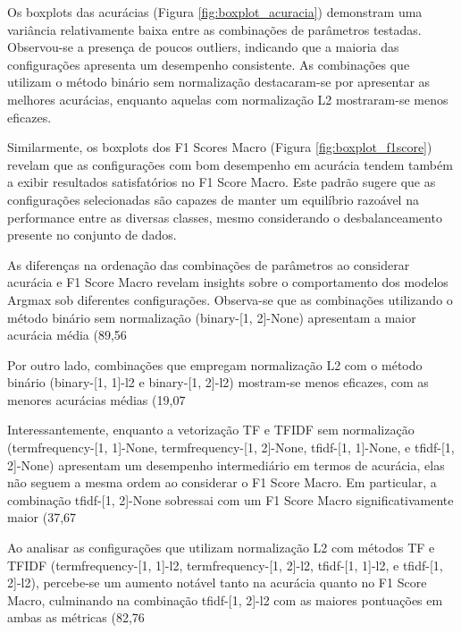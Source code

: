 Os boxplots das acurácias (Figura \ref{fig:boxplot_acuracia}) demonstram uma variância relativamente baixa entre as combinações de parâmetros testadas. Observou-se a presença de poucos outliers, indicando que a maioria das configurações apresenta um desempenho consistente. As combinações que utilizam o método binário sem normalização destacaram-se por apresentar as melhores acurácias, enquanto aquelas com normalização L2 mostraram-se menos eficazes.

Similarmente, os boxplots dos F1 Scores Macro (Figura \ref{fig:boxplot_f1score}) revelam que as configurações com bom desempenho em acurácia tendem também a exibir resultados satisfatórios no F1 Score Macro. Este padrão sugere que as configurações selecionadas são capazes de manter um equilíbrio razoável na performance entre as diversas classes, mesmo considerando o desbalanceamento presente no conjunto de dados.

As diferenças na ordenação das combinações de parâmetros ao considerar acurácia e F1 Score Macro revelam insights sobre o comportamento dos modelos Argmax sob diferentes configurações. Observa-se que as combinações utilizando o método binário sem normalização (binary-[1, 2]-None) apresentam a maior acurácia média (89,56%

Por outro lado, combinações que empregam normalização L2 com o método binário (binary-[1, 1]-l2 e binary-[1, 2]-l2) mostram-se menos eficazes, com as menores acurácias médias (19,07%

Interessantemente, enquanto a vetorização TF e TFIDF sem normalização (termfrequency-[1, 1]-None, termfrequency-[1, 2]-None, tfidf-[1, 1]-None, e tfidf-[1, 2]-None) apresentam um desempenho intermediário em termos de acurácia, elas não seguem a mesma ordem ao considerar o F1 Score Macro. Em particular, a combinação tfidf-[1, 2]-None sobressai com um F1 Score Macro significativamente maior (37,67%

Ao analisar as configurações que utilizam normalização L2 com métodos TF e TFIDF (termfrequency-[1, 1]-l2, termfrequency-[1, 2]-l2, tfidf-[1, 1]-l2, e tfidf-[1, 2]-l2), percebe-se um aumento notável tanto na acurácia quanto no F1 Score Macro, culminando na combinação tfidf-[1, 2]-l2 com as maiores pontuações em ambas as métricas (82,76%

